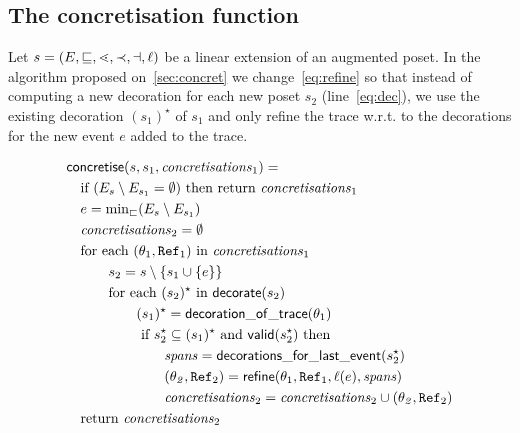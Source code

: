 \subsection{The concretisation function}
\label{sec:app_concret}

Let $s = (E,\sqsubseteq,\lessdot,\prec,\dashv,\ell)$ be a linear extension of an augmented poset.
In the algorithm proposed on~\autoref{sec:concret} we change~\autoref{eq:refine} so that instead of computing a new decoration for each new poset $s_2$ (line~\autoref{eq:dec}), we use the existing decoration $(s_1)^{\star}$ of $s_1$ and only refine the trace w.r.t. to the decorations for the new event $e$ added to the trace.

\begin{align}
  &\mathsf{concretise}(s,s_1,\mathit{concretisations}_1) = \\
  &\quad\text{if }(E_s\setminus E_{s_1} = \emptyset)\text{ then return }\mathit{concretisations}_1\\
  &\quad e = \text{min}_{\sqsubset}(E_s\setminus E_{s_1})\\
  &\quad\mathit{concretisations}_2 = \emptyset \\
  &\quad\text{for each }(\theta_1,\mathtt{Ref}_1)\text{ in }\mathit{concretisations}_1\\
  &\quad\qquad s_2 = s\setminus\{s_1\cup\{e\}\}\\
  \label{eq:dec}
  &\quad\qquad\text{for each }(s_2)^{\star}\text{ in }\mathsf{decorate}(s_2)\\
  &\quad\qquad\qquad (s_1)^{\star} = \mathsf{decoration\_of\_trace}(\theta_1)\\
  &\quad\qquad\qquad \text{ if }s_2^{\star}\subseteq (s_1)^{\star}\text{ and }\mathsf{valid}(s_2^{\star})\text{ then }\\
  &\quad\qquad\qquad\qquad \mathit{spans} = \mathsf{decorations\_for\_last\_event}(s_2^{\star})\\
  \label{eq:refine}
  &\quad\qquad\qquad\qquad (\mathit{\theta_2},\mathtt{Ref}_2) = \mathsf{refine}(\theta_1,\mathtt{Ref}_1,\ell(e),\mathit{spans})\\
  &\quad\qquad\qquad\qquad \mathit{concretisations}_2 = \mathit{concretisations}_2 \cup (\mathit{\theta_2},\mathtt{Ref}_2)\\
  &\quad\text{return }\mathit{concretisations}_2
\end{align}


